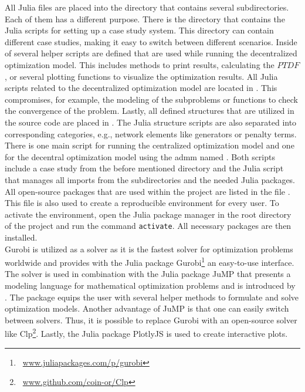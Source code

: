 All Julia files are placed into the directory  that contains several subdirectories. Each of them has a different purpose. There is the  directory that contains the Julia scripts for setting up a case study system. This directory can contain different case studies, making it easy to switch between different scenarios. Inside of  several helper scripts are defined that are used while running the decentralized optimization model. This includes methods to print results, calculating the $PTDF$, or several plotting functions to visualize the optimization results. All Julia scripts related to the decentralized optimization model are located in . This compromises, for example, the modeling of the subproblems or functions to check the convergence of the problem. Lastly, all defined structures that are utilized in the source code are placed in . The Julia structure scripts are also separated into corresponding categories, e.g., network elements like generators or penalty terms. There is one main script for running the centralized optimization model  and one for the decentral optimization model using the \gls{admm} named . Both scripts include a case study from the before mentioned directory and the Julia script  that manages all imports from the subdirectories and the needed Julia packages.\\

All open-source packages that are used within the project are listed in the file . This file is also used to create a reproducible environment for every user. To activate the environment, open the Julia package manager in the root directory of the project and run the command \lstinline[language=sh]{activate}. All necessary packages are then installed.\\

Gurobi is utilized as a solver as it is the fastest solver for optimization problems worldwide and provides with the Julia package Gurobi\footnote{~\url{www.juliapackages.com/p/gurobi}} an easy-to-use interface. The solver is used in combination with the Julia package JuMP that presents a modeling language for mathematical optimization problems and is introduced by \citet{dunning2017}. The package equips the user with several helper methods to formulate and solve optimization models. Another advantage of JuMP is that one can easily switch between solvers. Thus, it is possible to replace Gurobi with an open-source solver like Clp\footnote{~\url{www.github.com/coin-or/Clp}}. Lastly, the  Julia package PlotlyJS is used to create interactive plots.

